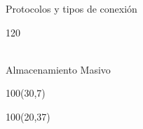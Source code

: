 \documentclass[aspectratio=169]{beamer}
\begin{document}
\begin{frame}{Protocolos y tipos de conexión}
\begin{textblock}{120}
     \\
     \\
    \end{textblock}
\end{frame}


\begin{frame}{Almacenamiento Masivo}
   \begin{textblock}{100}(30,7)
    \end{textblock}
    \begin{textblock}{100}(20,37)
    \end{textblock}
\end{frame}
\end{document}
